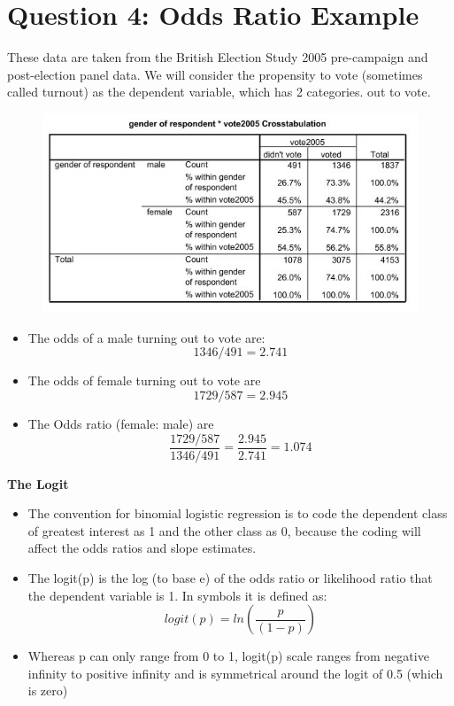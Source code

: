 \documentclass[a4paper,12pt]{article}
\begin{document}
\section*{Question 4: Odds Ratio Example}
	These data are taken from the British Election Study 2005 pre-campaign and
	post-election panel data. We will consider the propensity to vote (sometimes called turnout) as the
	dependent variable, which has 2 categories. 
	out to vote.
	\begin{center}
		\begin{figure}[h!]
			\includegraphics[scale=0.8]{LogWeek10A}\\
		\end{figure}
	\end{center}
\begin{itemize}
	\item The odds of a male turning out to vote are:
	\[1346/491 = 2.741\]
	\item The odds of female turning out to vote are
	\[1729/587 = 2.945\]
	\item The Odds ratio (female: male) are
	\[ \frac{1729/587 }{ 1346/491 } = \frac{2.945}{2.741}= 1.074\]
\end{itemize}	

\begin{framed}
\noindent \textbf{The Logit}\\
\begin{itemize}
	\item 		The convention for binomial logistic regression is to code the
	dependent class of greatest interest as 1 and the other class as 0, because the coding will
	affect the odds ratios and slope estimates.
	
\item 	The logit(p) is the log (to base e) of the odds ratio or likelihood ratio that the dependent
	variable is 1. In symbols it is defined as:
	\[ logit(p) = ln \left(\frac{p}{(1-p)}\right) \]
	
\item	Whereas p can only range from 0 to 1, logit(p) scale ranges from negative infinity to positive
	infinity and is symmetrical around the logit of 0.5 (which is zero)
\end{itemize}

\end{framed}
\end{document}
